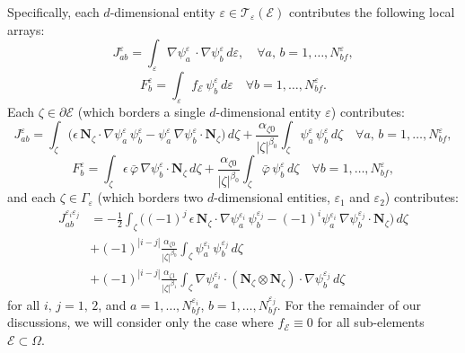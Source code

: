 	Specifically, each $d$-dimensional entity $\varepsilon \in \mathcal{T}_\varepsilon (\mathcal{E})$ contributes the following local arrays:
	\begin{equation}
			J^{\varepsilon}_{ab} = \int_{\varepsilon} \nabla \psi^{\varepsilon}_{a} \, \cdot \nabla \psi^{\varepsilon}_{b} \, d \varepsilon, \quad \forall a, \, b = 1, \ldots, N^{\varepsilon}_{bf},
	\end{equation}
	\begin{equation}
			F^{\varepsilon}_b = \int_{\varepsilon} f_{\mathcal{E}} \, \psi_b^{\varepsilon} \, d \varepsilon \quad \forall b = 1, \ldots, N^{\varepsilon}_{bf}.
	\end{equation}
	Each $\zeta \in \partial \mathcal{E}$ (which borders a single $d$-dimensional entity $\varepsilon$) contributes:
	\begin{equation}
			J^{\varepsilon}_{ab} = \int_{\zeta} \bigg( \epsilon \,  \mathbf{N}_{\zeta} \cdot \nabla \psi^{\varepsilon}_a \, \psi^{\varepsilon}_b - \psi^{\varepsilon}_a \, \nabla \psi^{\varepsilon}_b \cdot \mathbf{N}_{\zeta} \bigg) \, d \zeta + \frac{\alpha_{\zeta0}}{|\zeta|^{\beta_0}} \int_{\zeta} \psi_a^{\varepsilon} \, \psi_b^{\varepsilon} \, d \zeta \quad \forall a, \, b = 1, \ldots, N^{\varepsilon}_{bf},
	\end{equation}
	\begin{equation}
		F^{\varepsilon}_b = \int_{\zeta} \epsilon \, \bar{\varphi} \, \nabla \psi_b^{\varepsilon} \cdot \mathbf{N}_{\zeta} \, d \zeta + \frac{\alpha_{\zeta0}}{|\zeta|^{\beta_0}} \int_{\zeta} \bar{\varphi} \, \psi_b^{\varepsilon} \, d \zeta \quad \forall b = 1, \ldots, N^{\varepsilon}_{bf},
		\label{eq:boundary_term}
	\end{equation}
	and each $\zeta \in \Gamma_\varepsilon$ (which borders two $d$-dimensional entities, $\varepsilon_1$ and $\varepsilon_2$) contributes:
	\begin{align}
			J^{\varepsilon_i \varepsilon_j}_{ab} & = - \frac{1}{2} \int_{\zeta} \bigg( (-1)^{j} \, \epsilon \, \mathbf{N}_{\zeta} \cdot \nabla \psi_a^{\varepsilon_i} \, \psi_b^{\varepsilon_j} - (-1)^{i} \psi_a^{\varepsilon_i} \, \nabla \psi_b^{\varepsilon_j} \cdot \mathbf{N}_{\zeta} \bigg) \, d \zeta \\
			& + (-1)^{|i-j|} \frac{\alpha_{\zeta0}}{|\zeta|^{\beta_0}} \int_{\zeta} \psi_a^{\varepsilon_i} \, \psi_b^{\varepsilon_j} \, d \zeta \\
			& + (-1)^{|i-j|} \frac{\alpha_{\zeta1}}{|\zeta|^{\beta_1}} \int_{\zeta} \nabla \psi_a^{\varepsilon_i} \cdot (\mathbf{N}_\zeta \otimes \mathbf{N}_\zeta) \cdot \nabla \psi_b^{\varepsilon_j} \, d \zeta
	\end{align}
	for all $i, \, j = 1, \, 2$, and $a = 1, \ldots, N^{\varepsilon_i}_{bf}$, $b = 1, \ldots, N^{\varepsilon_j}_{bf}$. For the remainder of our discussions, we will consider only the case where $f_\mathcal{E} \equiv 0$ for all sub-elements $\mathcal{E} \subset \Omega$.
	
